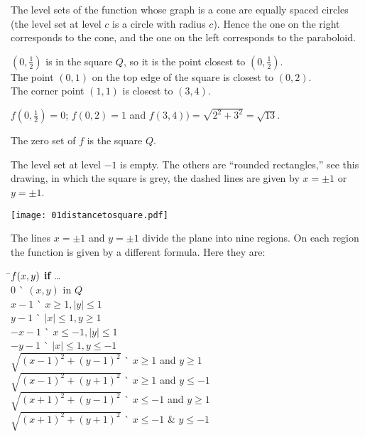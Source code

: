 The level sets of the function whose graph is a cone are equally spaced circles
(the level set at level $c$ is a circle with radius $c$).  Hence the one on the
right corresponds to the cone, and
the one on the left corresponds to the paraboloid.
\bigskip

\item[{\bfseries(III5.13a)}]

$(0, \frac{1} {2})$ is in the square $Q$, so it is the point closest to
$(0, \frac{1} {2})$.\\
The point $(0,1)$ on the top edge of the square is closest to $(0,2)$.\\
The corner point $(1,1)$ is closest to $(3,4)$.
\bigskip

\item[{\bfseries(III5.13b)}]

$f(0, \frac12) =0 $;
$f(0,2)=1$ and $f(3, 4))=\sqrt{2^2+3^2}=\sqrt{13}$.
\bigskip

\item[{\bfseries(III5.13c)}]

The zero set of $f$ is the square $Q$.
\bigskip

\item[{\bfseries(III5.13d)}]

The level set at level $-1$ is empty.  The others are ``rounded
rectangles,'' see this drawing, in which the square is grey, the dashed
lines are given by $x=\pm1$ or $y=\pm1$.
\begin{center}
    \texttt{[image: 01distancetosquare.pdf]}
\end{center}
\bigskip

\item[{\bfseries(III5.13e)}]

The lines $x=\pm1$ and $y=\pm1$ divide the plane into nine regions.
On each region the function is given by a different formula.
Here they are:
\begin{tabbing}
\=$\boldmath{f(x, y)}$ \=\`\textbf{ if } \ldots \\
\>$0$  \>\` $(x, y)$ in $Q$\\
\>$x-1$ \>\` $x\geq1, |y|\leq 1$\\
\>$y-1$ \>\` $|x|\leq 1, y\geq1$\\
\>$-x-1$ \>\` $x\le-1, |y|\leq 1$\\
\>$-y-1$ \>\` $|x|\leq 1, y\le-1$\\
\>$\sqrt{(x-1)^2+(y-1)^2}$ \>\` $x\ge1$ and $y\ge1$\\
\>$\sqrt{(x-1)^2+(y+1)^2}$ \>\` $x\ge1$ and $y\le-1$\\
\>$\sqrt{(x+1)^2+(y-1)^2}$ \>\` $x\le-1$ and $y\ge1$\\
\>$\sqrt{(x+1)^2+(y+1)^2}$ \>\` $x\le-1$ \& $y\le-1$\\
\end{tabbing}
\bigskip

